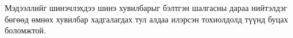 Мэдээллийг шинэчлэхдээ шинэ хувилбарыг бэлтгэн шалгасны дараа нийтэлдэг бөгөөд өмнөх хувилбар хадгалагдах тул алдаа илэрсэн тохиолдолд түүнд буцах боломжтой.
